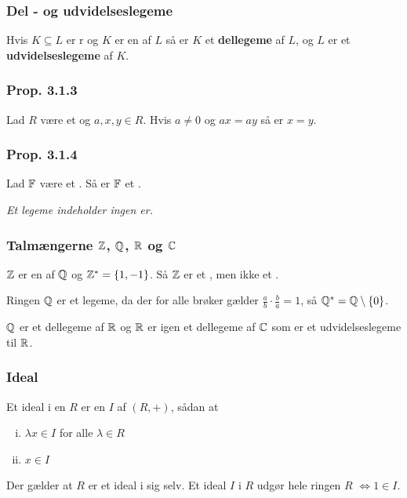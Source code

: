 \subsubsection{Del - og udvidelseslegeme}
\label{Del - og udvidelseslegeme}
Hvis $K \subseteq L$ er r og $K$ er en  af $L$
så er $K$ et \textbf{dellegeme} af $L$, og $L$ er et \textbf{udvidelseslegeme} af $K$.


\subsubsection{Prop. 3.1.3}
\label{Prop. 3.1.3}
Lad $R$ være et  og $a, x, y \in R$. Hvis $a \neq 0$
og $ax = ay$ så er $x = y$.

\subsubsection{Prop. 3.1.4}
\label{Prop. 3.1.4}
Lad $\mathbb{F}$ være et . Så er $\mathbb{F}$ et .

\textit{Et legeme indeholder ingen er.}

\subsubsection{Talmængerne $\mathbb{Z}$, $\mathbb{Q}$, $\mathbb{R}$ og $\mathbb{C}$}
\label{Talmaengerne_Z_Q_R og C}
$\mathbb{Z}$ er en  af $\mathbb{Q}$ og $\mathbb{Z}^* = \{ 1, -1 \}$. Så $\mathbb{Z}$ er et
, men ikke et .

Ringen $\mathbb{Q}$ er et legeme, da der for alle brøker gælder $\frac{a}{b} \cdot
\frac{b}{a} = 1$, så $\mathbb{Q}^* = \mathbb{Q} \setminus \{ 0 \}$.

$\mathbb{Q}$ er et dellegeme af $\mathbb{R}$ og $\mathbb{R}$ er igen et dellegeme af $\mathbb{C}$ som er et
udvidelseslegeme til $\mathbb{R}$.

\subsubsection{Ideal}
\label{Ideal}
Et ideal i en  $R$ er en  $I$ af $(R, +)$,
sådan at
\begin{enumerate}[(i)]
  \item $\lambda x \in I$ for alle $\lambda \in R$
  \item $x \in I$
\end{enumerate}   
Der gælder at $R$ er et ideal i sig selv. Et ideal $I$ i $R$ udgør hele ringen
$R$ $\iff 1 \in I$.



